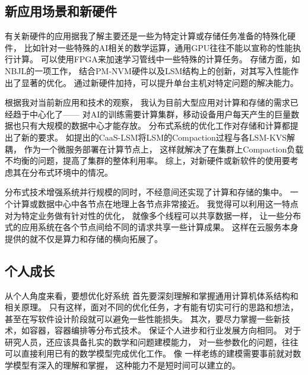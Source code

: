 \subsection{新应用场景和新硬件}

有关新硬件的应用据我了解主要还是一些为特定计算或存储任务准备的特殊化硬件，
比如针对一些特殊的AI相关的数学运算，通用GPU往往不能以宣称的性能执行计算。
可以使用FPGA来加速学习管线中一些特殊的计算任务\cite{nurvi_2020_fpga}。
存储方面，如NBJL的一项工作，
结合PM-NVM硬件以及LSM结构上的创新，对其写入性能作出了显著的优化\cite{he_flatlsm_2023}。
通过新硬件加持，可以提升单台主机对特定问题的解决能力。

根据我对当前新应用和技术的观察，
我认为目前大型应用对计算和存储的需求已经趋于中心化了——
对AI的训练需要计算集群，移动设备用户每天产生的巨量数据也只有大规模的数据中心才能存放。
分布式系统的优化工作对存储和计算都提出了新的要求。
如\cite{qiaolin_yu_caas-lsm_2024}提出的CaaS-LSM将LSM的Compaction过程与各LSM-KVS解耦，
作为一个微服务部署在计算节点上，
这样就解决了在集群上Compaction负载不均衡的问题，提高了集群的整体利用率。
综上，对新硬件或新软件的使用要考虑其在分布式环境中的情况。

分布式技术增强系统并行规模的同时，不经意间还实现了计算和存储的集中。
一个计算或数据中心中各节点在地理上各节点非常接近。
我觉得可以利用这一特点对为特定业务做有针对性的优化，
就像多个线程可以共享数据一样，
让一些分布式的应用系统在各个节点间给不同的请求共享一些计算成果。
这样在云服务本身提供的就不仅是算力和存储的横向拓展了。

\subsection{个人成长}

从个人角度来看，要想优化好系统
首先要深刻理解和掌握通用计算机体系结构和相关原理。
只有这样，面对不同的优化任务，才有能有切实可行的思路和想法，
甚至在写软件设计阶段就可以避免一些性能损失。
其次，要尽力掌握一些新技术，如容器，容器编排等分布式技术。
保证个人进步和行业发展方向相同。
对于研究人员，还应该具备扎实的数学和问题建模能力，
对一些参数化的问题，往往可以直接利用已有的数学模型完成优化工作。
像\cite{yang_gl-cache_nodate}
一样老练的建模需要事前就对数学模型有深入的理解和掌握，
这种能力不是短时间可以建立的。
